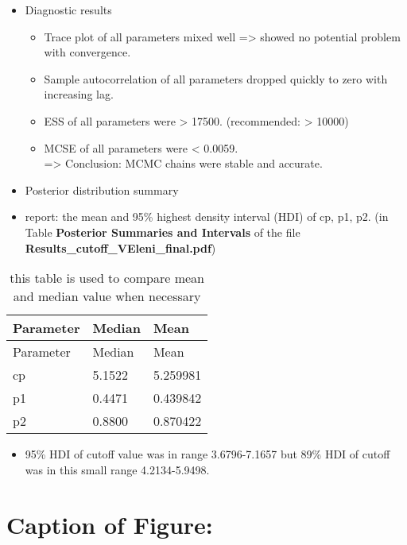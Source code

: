 \documentclass[]{elsarticle} %
\providecommand{\tightlist}{%
  \setlength{\itemsep}{0pt}\setlength{\parskip}{0pt}}
\begin{document}
\begin{itemize}
\tightlist
\item
  Diagnostic results

  \begin{itemize}
  \tightlist
  \item
    Trace plot of all parameters mixed well =\textgreater{} showed no
    potential problem with convergence.\\
  \item
    Sample autocorrelation of all parameters dropped quickly to zero
    with increasing lag.\\
  \item
    ESS of all parameters were \textgreater{} 17500. (recommended:
    \textgreater{} 10000)\\
  \item
    MCSE of all parameters were \textless{} 0.0059.\\
    =\textgreater{} Conclusion: MCMC chains were stable and accurate.
  \end{itemize}
\item
  Posterior distribution summary\\
\item
  report: the mean and 95\% highest density interval (HDI) of cp, p1,
  p2. (in Table \textbf{Posterior Summaries and Intervals} of the file
  \textbf{Results\_cutoff\_VEleni\_final.pdf})
\end{itemize}

\begin{longtable}[]{@{}lll@{}}
\caption{\label{tab:unnamed-chunk-2}this table is used to compare mean and
median value when necessary}\tabularnewline
\toprule
Parameter & Median & Mean\tabularnewline
\midrule
\endfirsthead
\toprule
Parameter & Median & Mean\tabularnewline
\midrule
\endhead
cp & 5.1522 & 5.259981\tabularnewline
p1 & 0.4471 & 0.439842\tabularnewline
p2 & 0.8800 & 0.870422\tabularnewline
\bottomrule
\end{longtable}

\begin{itemize}
\tightlist
\item
  95\% HDI of cutoff value was in range 3.6796-7.1657 but 89\% HDI of
  cutoff was in this small range 4.2134-5.9498.
\end{itemize}

\section{Caption of Figure:}\label{caption-of-figure}
\end{document}
